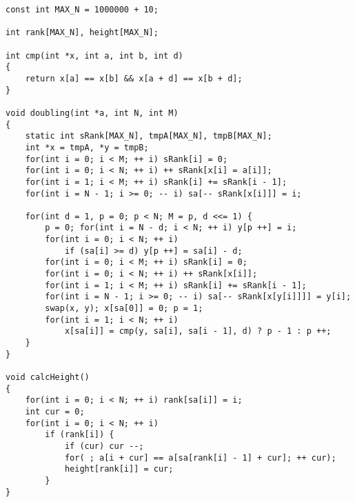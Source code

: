 \begin{lstlisting}
const int MAX_N = 1000000 + 10;

int rank[MAX_N], height[MAX_N];

int cmp(int *x, int a, int b, int d)
{
	return x[a] == x[b] && x[a + d] == x[b + d];
}

void doubling(int *a, int N, int M)
{
	static int sRank[MAX_N], tmpA[MAX_N], tmpB[MAX_N];
	int *x = tmpA, *y = tmpB;
	for(int i = 0; i < M; ++ i) sRank[i] = 0;
	for(int i = 0; i < N; ++ i) ++ sRank[x[i] = a[i]];
	for(int i = 1; i < M; ++ i) sRank[i] += sRank[i - 1];
	for(int i = N - 1; i >= 0; -- i) sa[-- sRank[x[i]]] = i;
	
	for(int d = 1, p = 0; p < N; M = p, d <<= 1) {
		p = 0; for(int i = N - d; i < N; ++ i) y[p ++] = i;
		for(int i = 0; i < N; ++ i)
			if (sa[i] >= d) y[p ++] = sa[i] - d;
		for(int i = 0; i < M; ++ i) sRank[i] = 0;
		for(int i = 0; i < N; ++ i) ++ sRank[x[i]];
		for(int i = 1; i < M; ++ i) sRank[i] += sRank[i - 1];
		for(int i = N - 1; i >= 0; -- i) sa[-- sRank[x[y[i]]]] = y[i];
		swap(x, y); x[sa[0]] = 0; p = 1;
		for(int i = 1; i < N; ++ i)
			x[sa[i]] = cmp(y, sa[i], sa[i - 1], d) ? p - 1 : p ++;
	}
}

void calcHeight()
{
	for(int i = 0; i < N; ++ i) rank[sa[i]] = i;
	int cur = 0;
	for(int i = 0; i < N; ++ i)
		if (rank[i]) {
			if (cur) cur --;
			for( ; a[i + cur] == a[sa[rank[i] - 1] + cur]; ++ cur);
			height[rank[i]] = cur;
		}
}
\end{lstlisting}
